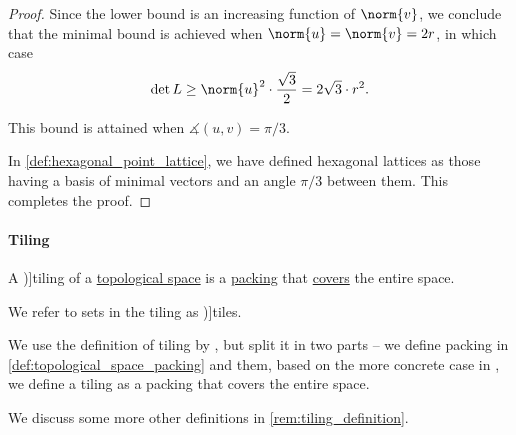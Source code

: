 \begin{proof}
  Since the lower bound is an increasing function of \( \norm{v} \), we conclude that the minimal bound is achieved when \( \norm{u} = \norm{v} = 2r \), in which case
  \begin{equation*}
    \det L \geq \norm{u}^2 \cdot \frac {\sqrt 3} 2 = 2\sqrt 3 \cdot r^2.
  \end{equation*}

  This bound is attained when \( \measuredangle(u, v) = \pi / 3 \).

  In \cref{def:hexagonal_point_lattice}, we have defined hexagonal lattices as those having a basis of minimal vectors and an angle \( \pi / 3 \) between them. This completes the proof.
\end{proof}

\paragraph{Tiling}

\begin{definition}\label{def:topological_space_tiling}
  A \term[ru=паркет / мозайка (\cite[465]{Маркушевич1967АналитическиеФункцииТом2})]{tiling} of a \hyperref[def:topological_space]{topological space} is a \hyperref[def:topological_space_packing]{packing} that \hyperref[def:set_cover]{covers} the entire space.

  We refer to sets in the tiling as \term[ru=плитка (\cite[465]{Маркушевич1967АналитическиеФункцииТом2})]{tiles}.
\end{definition}
\begin{comments}
  \item We use the definition of tiling by , but split it in two parts -- we define packing in \cref{def:topological_space_packing} and them, based on the more concrete case in , we define a tiling as a packing that covers the entire space.

  \item We discuss some more other definitions in \cref{rem:tiling_definition}.
\end{comments}

